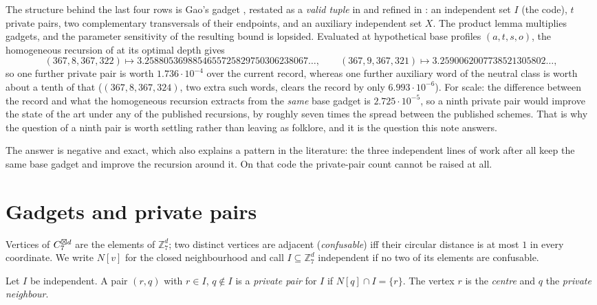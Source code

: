 The structure behind the last four rows is Gao's gadget \cite{gao2026}, restated as a
\emph{valid tuple} in \cite{bpz2026} and refined in \cite{tandon2026}: an independent set
$I$ (the code), $t$ private pairs, two complementary transversals of their endpoints, and an
auxiliary independent set $X$. The product lemma multiplies gadgets, and the parameter
sensitivity of the resulting bound is lopsided. Evaluated at hypothetical base profiles
$(a,t,s,o)$, the homogeneous recursion of \cite{gao2026,bpz2026} at its optimal depth gives
\[
(367,8,367,322)\mapsto 3.2588053698854655725829750306238067\ldots,\qquad
(367,9,367,321)\mapsto 3.2590062007738521305802\ldots,
\]
so one further private pair is worth $1.736\cdot 10^{-4}$ over the current record, whereas one
further auxiliary word of the neutral class is worth about a tenth of that
($(367,8,367,324)$, two extra such words, clears the record by only
$6.993\cdot10^{-6}$). For scale: the difference between the record \cite{tandon2026} and what
the homogeneous recursion extracts from the \emph{same} base gadget is $2.725\cdot10^{-5}$, so
a ninth private pair would improve the state of the art under any of the published recursions,
by roughly seven times the spread between the published schemes. That is why the question
of a ninth pair is worth settling rather than leaving as folklore, and it is the question this
note answers.

The answer is negative and exact, which also explains a pattern in the literature: the three
independent lines of work after \cite{itty2026} all keep the same base gadget and improve the
recursion around it. On that code the private-pair count cannot be raised at all.

\section{Gadgets and private pairs}
\label{sec:defs}

Vertices of $C_7^{\boxtimes d}$ are the elements of $\mathbb{Z}_7^d$; two distinct vertices are
adjacent (\emph{confusable}) iff their circular distance is at most $1$ in every coordinate.
We write $N[v]$ for the closed neighbourhood and call $I\subseteq\mathbb{Z}_7^d$ independent
if no two of its elements are confusable.

\begin{definition}
\label{def:pair}
Let $I$ be independent. A pair $(r,q)$ with $r\in I$, $q\notin I$ is a \emph{private pair}
for $I$ if $N[q]\cap I=\{r\}$. The vertex $r$ is the \emph{centre} and $q$ the \emph{private
neighbour}.
\end{definition}

